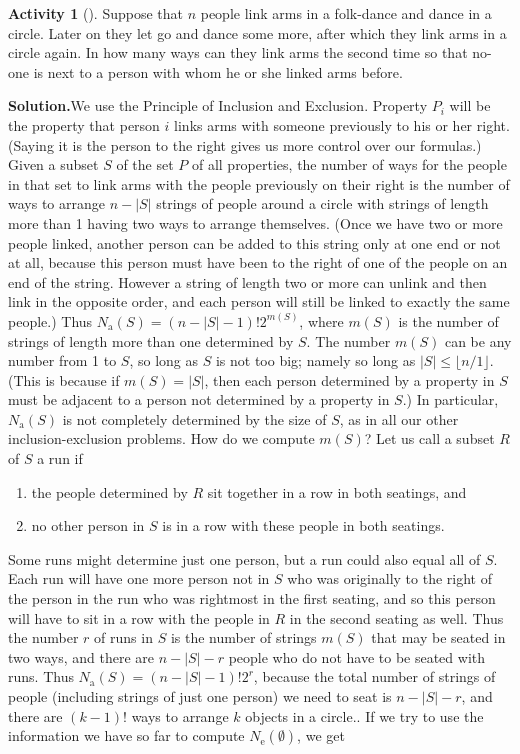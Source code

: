 \documentclass[10pt,]{book}
\theoremstyle{plain}
\theoremstyle{definition}
\newtheorem{activity}[project]{Activity}
\numberwithin{equation}{chapter}
\begin{document}
\begin{activity}[]\label{Hora}
Suppose that \(n\) people link arms in a folk-dance and dance in a circle. Later on they let go and dance some more, after which they link arms in a circle again. In how many ways can they link arms the second time so that no-one is next to a person with whom he or she linked arms before.%
\par\medskip\noindent%
\textbf{Solution.}\quad We use the Principle of Inclusion and Exclusion. Property \(P_i\) will be the property that person \(i\) links arms with someone previously to his or her right. (Saying it is the person to the right gives us more control over our formulas.) Given a subset \(S\) of the set \(P\) of all properties, the number of ways for the people in that set to link arms with the people previously on their right is the number of ways to arrange \(n-|S|\) strings of people around a circle with strings of length more than 1 having two ways to arrange themselves.  (Once we have two or more people linked, another person can be added to this string only at one end or not at all, because this person must have been to the right of one of the people on an end of the string. However a string of length two or more can unlink and then link in the opposite order, and each person will still be linked to exactly the same people.) Thus \(N_{\mbox{a} }(S)= (n-|S|-1)!2^{m(S)}\), where \(m(S)\) is the number of strings of length more than one determined by \(S\). The number \(m(S)\) can be any number from 1 to \(S\), so long as \(S\) is not too big; namely so long as \(|S|\le \lfloor n/1\rfloor\). (This is because if \(m(S)=|S|\), then each person determined by a property in \(S\) must be adjacent to a person not determined by a property in \(S\).) In particular, \(N_{\mbox{a} }(S)\) is not completely determined by the size of \(S\), as in all our other inclusion-exclusion problems. How do we compute \(m(S)\)? Let us call a subset \(R\) of \(S\) a run if \leavevmode%
\begin{enumerate}
\item\hypertarget{li-80}{}the people determined by \(R\) sit together in a row in both seatings, and%
\item\hypertarget{li-81}{}no other person in \(S\) is in a row with these people in both seatings.%
\end{enumerate}
 Some runs might determine just one person, but a run could also equal all of \(S\). Each run will have one more person not in \(S\) who was originally to the right of the person in the run who was rightmost in the first seating, and so this person will have to sit in a row with the people in \(R\) in the second seating as well. Thus the number \(r\) of runs in \(S\) is the number of strings \(m(S)\) that may be seated in two ways, and there are \(n-|S|-r\) people who do not have to be seated with runs. Thus \(N_{\mbox{a} }(S) = (n-|S|-1)!2^r\), because the total number of strings of people (including strings of just one person) we need to seat is \(n-|S| -r\), and there are \((k-1)!\) ways to arrange \(k\) objects in a circle.. If we try to use the information we have so far to compute \(N_{\mbox{e} }(\emptyset)\), we get%

\end{activity}
\end{document}

